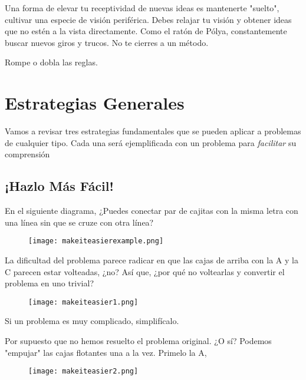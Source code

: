 Una forma de elevar tu receptividad de nuevas ideas es mantenerte 
"suelto", cultivar una especie de visión periférica. Debes relajar 
tu visión y obtener ideas que no estén a la vista directamente. Como 
el ratón de Pólya, constantemente buscar nuevos giros y trucos. 
No te cierres a un método.

\begin{moral}
    Rompe o dobla las reglas.
\end{moral}

\section{Estrategias Generales}

Vamos a revisar tres estrategias fundamentales que se pueden aplicar 
a problemas de cualquier tipo. Cada una será ejemplificada con 
un problema para \textit{facilitar} su comprensión

\subsection{¡Hazlo Más Fácil!}

\begin{example}
    En el siguiente diagrama, ¿Puedes conectar par de cajitas con la misma 
    letra con una línea sin que se cruze con otra línea?
\end{example}

\begin{figure}[h]
    \centering
    \texttt{[image: makeiteasierexample.png]}
\end{figure}

La dificultad del problema parece radicar en que las cajas de arriba 
con la A y la C parecen estar volteadas, ¿no? Así que, ¿por qué no 
voltearlas y convertir el problema en uno trivial?

\begin{figure}[h]
    \centering
    \texttt{[image: makeiteasier1.png]}
\end{figure}

\begin{moral}
    Si un problema es muy complicado, simplifícalo.
\end{moral}

Por supuesto que no hemos resuelto el problema original. ¿O sí? 
Podemos "empujar" las cajas flotantes una a la vez. Primelo la A,

\begin{figure}[h]
    \centering
    \texttt{[image: makeiteasier2.png]}
\end{figure}


